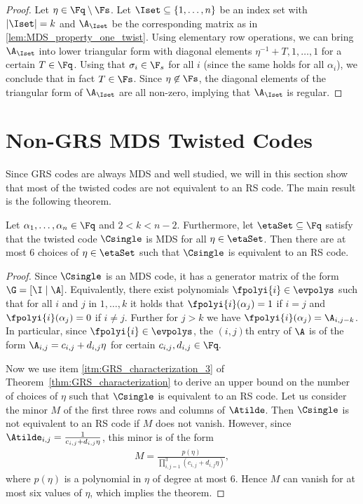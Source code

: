 \documentclass[conference,a4paper]{IEEEtran}
\begin{document}
\begin{proof}
Let $\eta \in \Fq \setminus \Fs$.
Let $\Iset \subseteq \{1,\dots,n\}$ be an index set with $|\Iset|=k$ and $\A_\Iset$ be the corresponding matrix as in \cref{lem:MDS_property_one_twist}.
Using elementary row operations, we can bring $\A_\Iset$ into lower triangular form
with diagonal elements $\eta^{-1} + T,1, \ldots, 1$ for a certain $T \in \Fq$. Using that $\sigma_i \in \F_s$ for all $i$ (since the same holds for all $\alpha_i$), we conclude that in fact $T \in \Fs$.
Since $\eta \not\in \Fs$, the diagonal elements of the triangular form of $\A_\Iset$ are all non-zero, implying that $\A_\Iset$ is regular.
\end{proof}




\section{Non-GRS MDS Twisted Codes}

\noindent
Since GRS codes are always MDS and well studied, we will in this section show that most of the twisted codes are not equivalent to an RS code. The main result is the following theorem.

\begin{theorem}\label{thm:not_GRS_one_twist}
Let $\alpha_1,\dots,\alpha_n \in \Fq$ and $2 < k < n-2$. 
Furthermore, let $\etaSet \subseteq \Fq$ satisfy that the twisted code $\Csingle$ is MDS for all $\eta \in \etaSet$.
Then there are at most $6$ choices of $\eta \in \etaSet$ such that $\Csingle$ is equivalent to an RS code.
\end{theorem}
\begin{proof}
Since $\Csingle$ is an MDS code, it has a generator matrix of the form $\G = [\I \mid \A]$. Equivalently, there exist polynomials $\fpolyi{i} \in \evpolys$ such that for all $i$ and $j$ in $1,\ldots, k$ it holds that $\fpolyi{i}(\alpha_j) = 1$ if $i=j$ and $\fpolyi{i}(\alpha_j) = 0$ if $i \neq j.$ Further for $j>k$ we have $\fpolyi{i}(\alpha_j) = \A_{i,j-k}$. In particular, since $\fpolyi{i} \in \evpolys$, the $(i,j)$th entry of $\A$ is of the form $\A_{i,j}=c_{i,j}+d_{i,j}\eta$ for certain $c_{i,j},d_{i,j} \in \Fq.$

Now we use item \ref{itm:GRS_characterization_3} of Theorem~\ref{thm:GRS_characterization} to derive an upper bound on the number of choices of $\eta$ such that $\Csingle$ is equivalent to an RS code. Let us consider the minor $M$ of the first three rows and columns of $\Atilde$. Then $\Csingle$ is not equivalent to an RS code if $M$ does not vanish. However, since $\Atilde_{i,j}=\frac{1}{c_{i,j}+d_{i,j}\eta}$, this minor is of the form
\begin{align*}
M=\frac{p(\eta)}{\prod_{i,j=1}^3(c_{i,j}+d_{i,j}\eta)},
\end{align*}
where $p(\eta)$ is a polynomial in $\eta$ of degree at most $6$. Hence $M$ can vanish for at most six values of $\eta$, which implies the theorem.
\end{proof}
\end{document}
